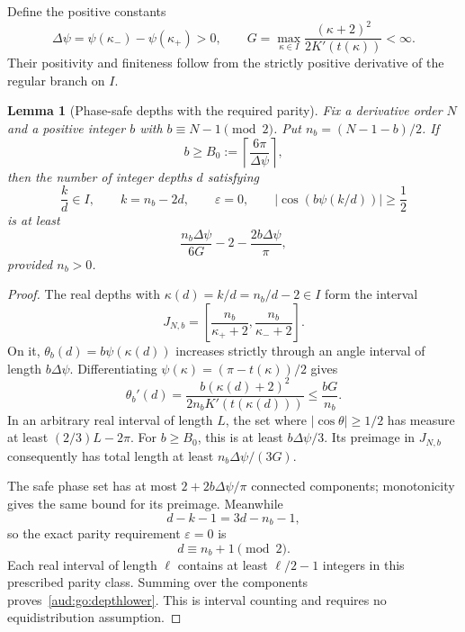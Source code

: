 \documentclass[11pt,a4paper]{article}
\numberwithin{equation}{section}
\newtheorem{lemma}[theorem]{Lemma}
\begin{document}
Define the positive constants
\begin{equation}\label{aud:go:countconstants}
 \Delta\psi=\psi(\kappa_-)-\psi(\kappa_+)>0,\qquad
 G=\max_{\kappa\in I}\frac{(\kappa+2)^2}{2K'(t(\kappa))}<\infty.
\end{equation}
Their positivity and finiteness follow from the strictly positive derivative of the regular branch on $I$.

\begin{lemma}[Phase-safe depths with the required parity]\label{aud:go:depthcount}
Fix a derivative order $N$ and a positive integer $b$ with $b\equiv N-1\pmod2$. Put $n_b=(N-1-b)/2$. If
\[
 b\ge B_0:=\left\lceil\frac{6\pi}{\Delta\psi}\right\rceil,
\]
then the number of integer depths $d$ satisfying
\[
 \frac{k}{d}\in I,\qquad k=n_b-2d,\qquad
 \varepsilon=0,\qquad |\cos(b\psi(k/d))|\ge\frac12
\]
is at least
\begin{equation}\label{aud:go:depthlower}
 \frac{n_b\Delta\psi}{6G}-2-\frac{2b\Delta\psi}{\pi},
\end{equation}
provided $n_b>0$.
\end{lemma}
\begin{proof}
The real depths with $\kappa(d)=k/d=n_b/d-2\in I$ form the interval
\[
 J_{N,b}=\left[\frac{n_b}{\kappa_++2},\frac{n_b}{\kappa_-+2}\right].
\]
On it, $\theta_b(d)=b\psi(\kappa(d))$ increases strictly through an angle interval of length $b\Delta\psi$. Differentiating $\psi(\kappa)=(\pi-t(\kappa))/2$ gives
\[
 \theta_b'(d)=\frac{b(\kappa(d)+2)^2}{2n_bK'(t(\kappa(d)))}
 \le\frac{bG}{n_b}.
\]
In an arbitrary real interval of length $L$, the set where $|\cos\theta|\ge1/2$ has measure at least $(2/3)L-2\pi$. For $b\ge B_0$, this is at least $b\Delta\psi/3$. Its preimage in $J_{N,b}$ consequently has total length at least $n_b\Delta\psi/(3G)$.

The safe phase set has at most $2+2b\Delta\psi/\pi$ connected components; monotonicity gives the same bound for its preimage. Meanwhile
\[
 d-k-1=3d-n_b-1,
\]
so the exact parity requirement $\varepsilon=0$ is
\begin{equation}\label{aud:go:depthparity}
 d\equiv n_b+1\pmod2.
\end{equation}
Each real interval of length $\ell$ contains at least $\ell/2-1$ integers in this prescribed parity class. Summing over the components proves~\eqref{aud:go:depthlower}. This is interval counting and requires no equidistribution assumption.
\end{proof}
\end{document}
